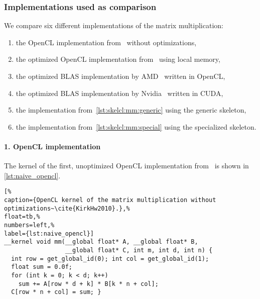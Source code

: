 \subsubsection*{Implementations used as comparison}
We compare six different implementations of the matrix multiplication:
\begin{enumerate}
  \item the OpenCL implementation from~\cite{KirkHw2010} without optimizations,
  \item the optimized OpenCL implementation from~\cite{KirkHw2010} using \GPU local memory,
  \item the optimized BLAS implementation by AMD~\cite{APPML} written in OpenCL,
  \item the optimized BLAS implementation by Nvidia~\cite{cuBLAS} written in CUDA,
  \item the implementation from~\autoref{lst:skelcl:mm:generic} using the generic \allpairs skeleton,
  \item the implementation from~\autoref{lst:skelcl:mm:special} using the specialized \allpairs skeleton.
\end{enumerate}

\paragraph{1. OpenCL implementation}
The kernel of the first, unoptimized OpenCL implementation from~\cite{KirkHw2010} is shown in \autoref{lst:naive_opencl}.
\begin{lstlisting}[%                                                             
caption={OpenCL kernel of the matrix multiplication without optimizations~\cite{KirkHw2010}.},%
float=tb,%
numbers=left,%
label={lst:naive_opencl}]
__kernel void mm(__global float* A, __global float* B,
                 __global float* C, int m, int d, int n) {
  int row = get_global_id(0); int col = get_global_id(1);
  float sum = 0.0f;
  for (int k = 0; k < d; k++)
    sum += A[row * d + k] * B[k * n + col];
  C[row * n + col] = sum; }
\end{lstlisting}

\vspace{-.5em}
